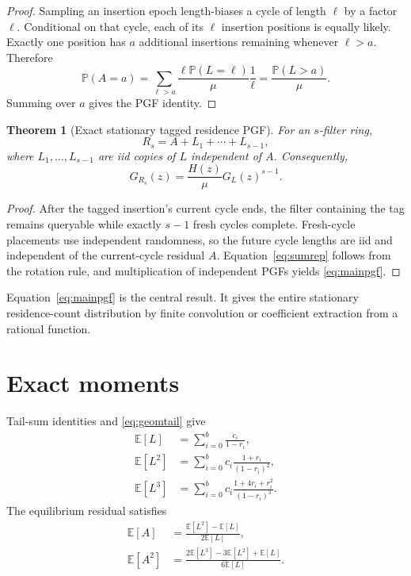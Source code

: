 \documentclass[11pt]{article}
\newtheorem{theorem}{Theorem}
\newcommand{\E}{\mathbb{E}}
\newcommand{\Prb}{\mathbb{P}}
\begin{document}
\begin{proof}
Sampling an insertion epoch length-biases a cycle of length $\ell$ by a factor $\ell$. Conditional on that cycle, each of its $\ell$ insertion positions is equally likely. Exactly one position has $a$ additional insertions remaining whenever $\ell>a$. Therefore
\[
\Prb(A=a)
=\sum_{\ell>a}\frac{\ell\Prb(L=\ell)}{\mu}\frac1\ell
=\frac{\Prb(L>a)}{\mu}.
\]
Summing over $a$ gives the PGF identity.
\end{proof}

\begin{theorem}[Exact stationary tagged residence PGF]
For an $s$-filter ring,
\begin{equation}
R_s=A+L_1+\cdots+L_{s-1},
\label{eq:sumrep}
\end{equation}
where $L_1,\ldots,L_{s-1}$ are iid copies of $L$ independent of $A$. Consequently,
\begin{equation}
\boxed{
G_{R_s}(z)=\frac{H(z)}{\mu}G_L(z)^{s-1}.
}
\label{eq:mainpgf}
\end{equation}
\end{theorem}

\begin{proof}
After the tagged insertion's current cycle ends, the filter containing the tag remains queryable while exactly $s-1$ fresh cycles complete. Fresh-cycle placements use independent randomness, so the future cycle lengths are iid and independent of the current-cycle residual $A$. Equation~\eqref{eq:sumrep} follows from the rotation rule, and multiplication of independent PGFs yields \eqref{eq:mainpgf}.
\end{proof}

Equation~\eqref{eq:mainpgf} is the central result. It gives the entire stationary residence-count distribution by finite convolution or coefficient extraction from a rational function.

\section{Exact moments}
Tail-sum identities and \eqref{eq:geomtail} give
\begin{align}
\E[L]
&=\sum_{i=0}^{b}\frac{c_i}{1-r_i},\\
\E[L^2]
&=\sum_{i=0}^{b}c_i\frac{1+r_i}{(1-r_i)^2},\\
\E[L^3]
&=\sum_{i=0}^{b}c_i\frac{1+4r_i+r_i^2}{(1-r_i)^3}.
\end{align}
The equilibrium residual satisfies
\begin{align}
\E[A]
&=\frac{\E[L^2]-\E[L]}{2\E[L]},\label{eq:EA}\\
\E[A^2]
&=\frac{2\E[L^3]-3\E[L^2]+\E[L]}{6\E[L]}.
\label{eq:EA2}
\end{align}
\end{document}
